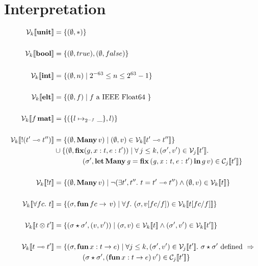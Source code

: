 \section{Interpretation}

\begin{align*}
  \V{k}{ \Unit } &= \{ (\empH, \ast) \} \\
\\
    \V{k}{ \Bool } &= \{ (\empH, true), (\empH, false) \} \\
\\
    \V{k}{ \Int } &= \{ (\empH, n) \mid 2^{-63} \leq n \leq 2^{63} -1 \} \\
\\
    \V{k}{ \Elt } &= \{ (\empH, f) \mid f \textrm{ a IEEE Float64 } \} \\
\\
    \V{k}{ f \, \Mat } &= \{ (\{ l \mapsto_{2^{-f}} \_ \} , l) \} \\
\\
    \V{k}{ \Bang (t' \multimap t'') } &= \{ (\empH, \Many\, v) \mid (\empH, v) \in \V{k}{ t' \multimap t'' } \} \\
                                      & \cup \{ (\empH, \ottkw{fix} (g, x : t, e : t')) \mid \forall \, j \leq k, (\sigma', v') \in \V{j}{ t' }.\\
                                      & \qquad \qquad (\sigma', \letManyG v) \in \C{j}{ t' } \} \\
\\
    \V{k}{ \Bang t } &= \{ (\empH, \Many\, v) \mid \neg (\exists t', t''.\ t = t' \multimap t'') \wedge (\empH, v) \in \V{k}{t} \} \\
\\
    \V{k}{ \forall fc.\  t } &= \{ (\sigma, \ottkw{fun}\, fc \rightarrow \, v) \mid \forall f.\ (\sigma, v [ fc / f ]) \in \V{k}{ t [ fc / f ] } \} \\
\\
    \V{k}{ t \otimes t' } &= \{ (\sigma \star \sigma', ( v, v' )) \mid (\sigma, v) \in \V{k}{t} \wedge (\sigma', v') \in \V{k}{t'} \} \\
\\
    \V{k}{ t \multimap t' } &= \{ (\sigma, \ottkw{fun}\, x : t \rightarrow e) \mid \forall j \leq k, (\sigma', v') \in \V{j}{ t' }.\ \sigma \star \sigma' \textrm{ defined } \Rightarrow \\
                            & \qquad \qquad (\sigma \star \sigma', (\ottkw{fun}\, x : t \rightarrow e)\, v') \in \C{j}{ t' } \} \\

\end{align*}
